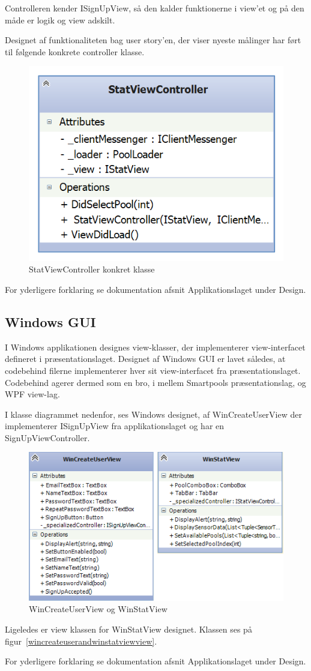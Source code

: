 Controlleren kender ISignUpView, så den kalder funktionerne i view'et og på den måde er logik og view adskilt.

Designet af funktionaliteten bag user story'en, der viser nyeste målinger har ført til følgende konkrete controller klasse.

\begin{figure}
\centering
\includegraphics[width=0.35\linewidth]{figs/design/application_statviewcontroller}
\caption{StatViewController konkret klasse}
\label{fig:application_statviewcontroller}
\end{figure}

For yderligere forklaring se dokumentation afsnit Applikationslaget under Design.

\subsection{Windows GUI}
I Windows applikationen designes view-klasser, der implementerer view-interfacet defineret i præsentationslaget.
Designet af Windows GUI er lavet således, at codebehind filerne implementerer hver sit view-interfacet fra præsentationslaget. Codebehind agerer dermed som en bro, i mellem Smartpools præsentationslag, og WPF view-lag.

I klasse diagrammet nedenfor, ses Windows designet, af WinCreateUserView der implementerer ISignUpView fra applikationslaget og har en SignUpViewController.
\begin{figure}
\centering
\includegraphics[width=0.7\linewidth]{figs/design/wincreateuserandwinstatviewview}
\caption{WinCreateUserView og WinStatView}
\label{fig:wincreateuserandwinstatviewview}
\end{figure}

Ligeledes er view klassen for WinStatView designet.
Klassen ses på figur~\ref{wincreateuserandwinstatviewview}.

For yderligere forklaring se dokumentation afsnit Applikationslaget under Design.
